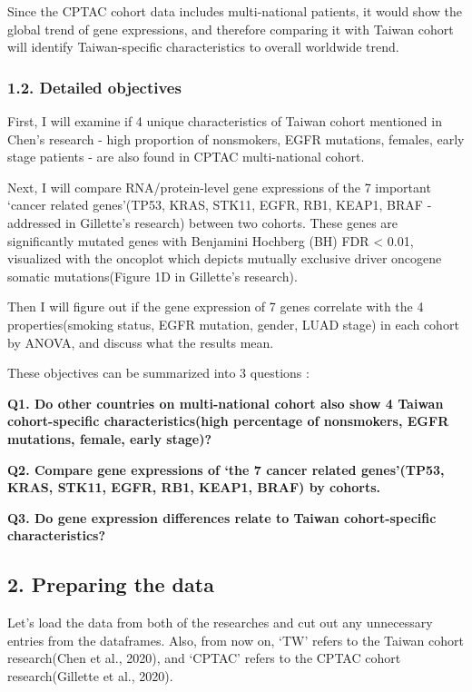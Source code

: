 \documentclass[
]{article}
\begin{document}
Since the CPTAC cohort data includes multi-national patients, it would
show the global trend of gene expressions, and therefore comparing it
with Taiwan cohort will identify Taiwan-specific characteristics to
overall worldwide trend.

\hypertarget{detailed-objectives}{%
\subsubsection{1.2. Detailed objectives}\label{detailed-objectives}}

First, I will examine if 4 unique characteristics of Taiwan cohort
mentioned in Chen's research - high proportion of nonsmokers, EGFR
mutations, females, early stage patients - are also found in CPTAC
multi-national cohort.

Next, I will compare RNA/protein-level gene expressions of the 7
important `cancer related genes'(TP53, KRAS, STK11, EGFR, RB1, KEAP1,
BRAF - addressed in Gillette's research) between two cohorts. These
genes are significantly mutated genes with Benjamini Hochberg (BH) FDR
\textless{} 0.01, visualized with the oncoplot which depicts mutually
exclusive driver oncogene somatic mutations(Figure 1D in Gillette's
research).

Then I will figure out if the gene expression of 7 genes correlate with
the 4 properties(smoking status, EGFR mutation, gender, LUAD stage) in
each cohort by ANOVA, and discuss what the results mean.

These objectives can be summarized into 3 questions :

\textbf{Q1. Do other countries on multi-national cohort also show 4
Taiwan cohort-specific characteristics(high percentage of nonsmokers,
EGFR mutations, female, early stage)?}

\textbf{Q2. Compare gene expressions of `the 7 cancer related
genes'(TP53, KRAS, STK11, EGFR, RB1, KEAP1, BRAF) by cohorts.}

\textbf{Q3. Do gene expression differences relate to Taiwan
cohort-specific characteristics?}

\hypertarget{preparing-the-data}{%
\subsection{2. Preparing the data}\label{preparing-the-data}}

Let's load the data from both of the researches and cut out any
unnecessary entries from the dataframes. Also, from now on, `TW' refers
to the Taiwan cohort research(Chen et al., 2020), and `CPTAC' refers to
the CPTAC cohort research(Gillette et al., 2020).
\end{document}
